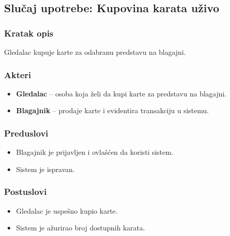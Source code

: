 \subsection{Slučaj upotrebe: Kupovina karata uživo}

\subsubsection*{Kratak opis}
Gledalac kupuje karte za odabranu predstavu na blagajni.
\subsubsection*{Akteri}
\begin{itemize}
    \item \textbf{Gledalac} -- osoba koja želi da kupi karte za predstavu na blagajni.
     \item \textbf{Blagajnik} -- prodaje karte i evidentira transakciju u sistemu.
\end{itemize}

\subsubsection*{Preduslovi}
\begin{itemize}
    \item Blagajnik je prijavljen i ovlašćen da koristi sistem.
    \item Sistem je ispravan.
\end{itemize}

\subsubsection*{Postuslovi}
\begin{itemize}
    \item Gledalac je uspešno kupio karte.
    \item Sistem je ažurirao broj dostupnih karata.
\end{itemize}

